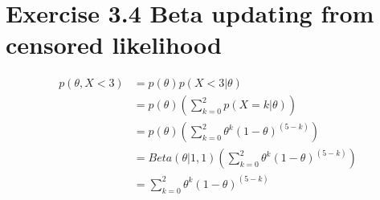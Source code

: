 \documentclass{jsarticle}
\begin{document}
\section*{Exercise 3.4 Beta updating from censored likelihood}
\begin{align}
p(\theta,X<3) & = p(\theta)p(X<3|\theta)\\
& = p(\theta)(\sum_{k=0}^{2}p(X=k|\theta))\\
& = p(\theta)(\sum_{k=0}^{2}\theta^k(1-\theta)^{(5-k)})\\
& = Beta(\theta|1,1)(\sum_{k=0}^{2}\theta^k(1-\theta)^{(5-k)})\\
& = \sum_{k=0}^{2}\theta^k(1-\theta)^{(5-k)}
\end{align}
\end{document}
